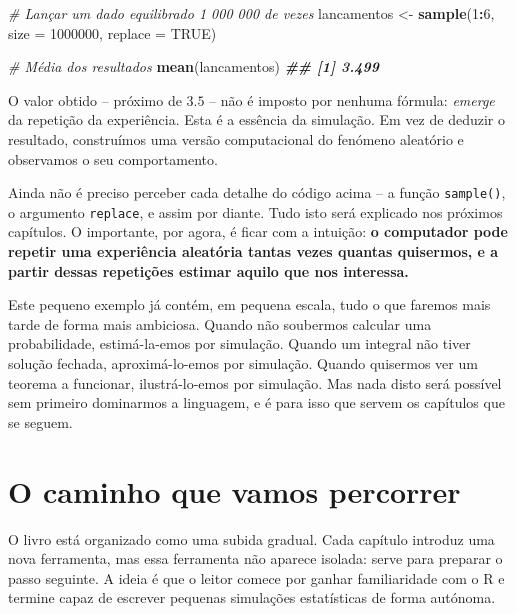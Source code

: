\documentclass[
  portuguese,
  11pt,
  openany]{book}
\newenvironment{Shaded}{\begin{snugshade}}{\end{snugshade}}
\newcommand{\AttributeTok}[1]{\textcolor[rgb]{0.13,0.29,0.53}{#1}}
\newcommand{\CommentTok}[1]{\textcolor[rgb]{0.56,0.35,0.01}{\textit{#1}}}
\newcommand{\ConstantTok}[1]{\textcolor[rgb]{0.56,0.35,0.01}{#1}}
\newcommand{\DecValTok}[1]{\textcolor[rgb]{0.00,0.00,0.81}{#1}}
\newcommand{\DocumentationTok}[1]{\textcolor[rgb]{0.56,0.35,0.01}{\textbf{\textit{#1}}}}
\newcommand{\FunctionTok}[1]{\textcolor[rgb]{0.13,0.29,0.53}{\textbf{#1}}}
\newcommand{\NormalTok}[1]{#1}
\newcommand{\OtherTok}[1]{\textcolor[rgb]{0.56,0.35,0.01}{#1}}
\newcommand{\SpecialCharTok}[1]{\textcolor[rgb]{0.81,0.36,0.00}{\textbf{#1}}}
\begin{document}
\begin{Shaded}
\begin{Highlighting}[]
\CommentTok{\# Lançar um dado equilibrado 1 000 000 de vezes}
\NormalTok{lancamentos }\OtherTok{\textless{}{-}} \FunctionTok{sample}\NormalTok{(}\DecValTok{1}\SpecialCharTok{:}\DecValTok{6}\NormalTok{, }\AttributeTok{size =} \DecValTok{1000000}\NormalTok{, }\AttributeTok{replace =} \ConstantTok{TRUE}\NormalTok{)}

\CommentTok{\# Média dos resultados}
\FunctionTok{mean}\NormalTok{(lancamentos)}
\DocumentationTok{\#\# [1] 3.499}
\end{Highlighting}
\end{Shaded}

O valor obtido -- próximo de \(3.5\) -- não é imposto por nenhuma fórmula: \emph{emerge} da repetição da experiência. Esta é a essência da simulação. Em vez de deduzir o resultado, construímos uma versão computacional do fenómeno aleatório e observamos o seu comportamento.

Ainda não é preciso perceber cada detalhe do código acima -- a função \texttt{sample()}, o argumento \texttt{replace}, e assim por diante. Tudo isto será explicado nos próximos capítulos. O importante, por agora, é ficar com a intuição: \textbf{o computador pode repetir uma experiência aleatória tantas vezes quantas quisermos, e a partir dessas repetições estimar aquilo que nos interessa.}

Este pequeno exemplo já contém, em pequena escala, tudo o que faremos mais tarde de forma mais ambiciosa. Quando não soubermos calcular uma probabilidade, estimá-la-emos por simulação. Quando um integral não tiver solução fechada, aproximá-lo-emos por simulação. Quando quisermos ver um teorema a funcionar, ilustrá-lo-emos por simulação. Mas nada disto será possível sem primeiro dominarmos a linguagem, e é para isso que servem os capítulos que se seguem.

\section{O caminho que vamos percorrer}\label{o-caminho-que-vamos-percorrer}

O livro está organizado como uma subida gradual. Cada capítulo introduz uma nova ferramenta, mas essa ferramenta não aparece isolada: serve para preparar o passo seguinte. A ideia é que o leitor comece por ganhar familiaridade com o R e termine capaz de escrever pequenas simulações estatísticas de forma autónoma.
\end{document}
